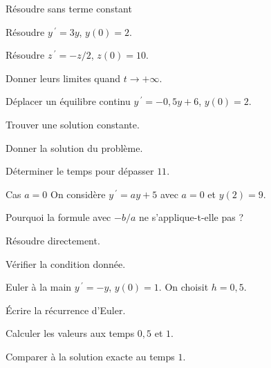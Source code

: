 \begingroup\renewcommand{\otBesoinPlace}[1]{}\begin{minipage}{\linewidth}
\begin{exercice}[2]{Résoudre sans terme constant}

\begin{questions}
\item Résoudre $y\,\!^{\prime}=3y$, $y(0)=2$.
\item Résoudre $z\,\!^{\prime}=-z/2$, $z(0)=10$.
\item Donner leurs limites quand $t\to+\infty$.
\end{questions}
\end{exercice}
\begin{exercice}[2]{Déplacer un équilibre continu}
$y\,\!^{\prime}=-0{,}5y+6$, $y(0)=2$.
\begin{questions}
\item Trouver une solution constante.
\item Donner la solution du problème.
\item Déterminer le temps pour dépasser $11$.
\end{questions}
\end{exercice}
\begin{exercice}[2]{Cas $a=0$}
On considère $y\,\!^{\prime}=ay+5$ avec $a=0$ et $y(2)=9$.
\begin{questions}
\item Pourquoi la formule avec $-b/a$ ne s’applique-t-elle pas ?
\item Résoudre directement.
\item Vérifier la condition donnée.
\end{questions}
\end{exercice}
\begin{exercice}[2]{Euler à la main}
$y\,\!^{\prime}=-y$, $y(0)=1$. On choisit $h=0{,}5$.
\begin{questions}
\item Écrire la récurrence d’Euler.
\item Calculer les valeurs aux temps $0{,}5$ et $1$.
\item Comparer à la solution exacte au temps $1$.
\end{questions}
\end{exercice}
\end{minipage}\endgroup
\clearpage
{}

